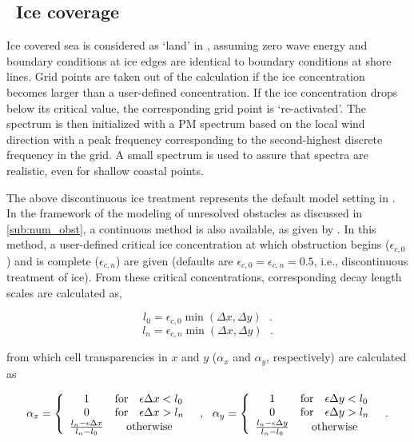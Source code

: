 \vssub
\subsection{~Ice coverage} \label{sub:num_ice}

\noindent
Ice covered sea is considered as `land' in \ws, assuming zero wave energy and
boundary conditions at ice edges are identical to boundary conditions at shore
lines. Grid points are taken out of the calculation if the ice concentration
becomes larger than a user-defined concentration. If the ice concentration
drops below its critical value, the corresponding grid point is
`re-activated'. The spectrum is then initialized with a PM spectrum based on
the local wind direction with a peak frequency corresponding to the
second-highest discrete frequency in the grid. A small spectrum is used to
assure that spectra are realistic, even for shallow coastal points.

The above discontinuous ice treatment represents the default model setting in
\ws. In the framework of the modeling of unresolved obstacles as discussed in
\para\ref{sub:num_obst}, a continuous method is also available, as given by
\cite{tol:OMOD03a}. In this method, a user-defined critical ice concentration
at which obstruction begins ($\epsilon_{c,0}$) and is complete
($\epsilon_{c,n}$) are given (defaults are $\epsilon_{c,0} = \epsilon_{c,n} =
0.5$, i.e., discontinuous treatment of ice). From these critical
concentrations, corresponding decay length scales are calculated as,

\begin{equation}
l_0 = \epsilon_{c,0} \min ( \Delta x , \Delta y )
\:\:\: . \label{eq:l0}
\end{equation}
\begin{equation}
l_n = \epsilon_{c,n} \min ( \Delta x , \Delta y )
\:\:\: . \label{eq:ln}
\end{equation}

\noindent
from which cell transparencies in $x$ and $y$ ($\alpha_x$ and $\alpha_y$,
respectively) are calculated as

\begin{equation}
\alpha_x = \left \{ \begin{array}{ccl}
 1 & \mbox{for} & \epsilon \Delta x < l_0 \\
 0 & \mbox{for} & \epsilon \Delta x > l_n \\
\frac{l_n - \epsilon \Delta x}{l_n - l_0} & \multicolumn{2}{c}{\mbox{otherwise}} 
\end{array} \right .
\:\:\: , \:\:\:
\alpha_y = \left \{ \begin{array}{ccl}
 1 & \mbox{for} & \epsilon \Delta y < l_0 \\
 0 & \mbox{for} & \epsilon \Delta y > l_n \\
\frac{l_n - \epsilon \Delta y}{l_n - l_0} & \multicolumn{2}{c}{\mbox{otherwise}} 
\end{array} \right .
\:\:\: . \label{eq:ice_0} 
\end{equation}

